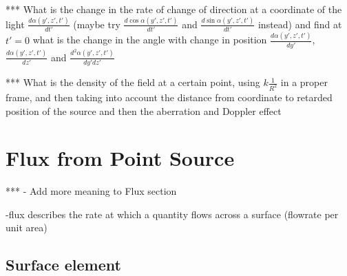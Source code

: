 *** What is the change in the rate of change of direction at a coordinate of the light $\frac{d\alpha(y{'},z{'},t{'})}{dt{'}}$ (maybe try $\frac{d\cos\alpha(y{'},z{'},t{'})}{dt{'}}$ and $\frac{d\sin\alpha(y{'},z{'},t{'})}{dt{'}}$ instead) and find at ${t{'}} = 0$ what is the change in the angle with change in position $\frac{d\alpha(y{'},z{'},t{'})}{dy{'}}$, $\frac{d\alpha(y{'},z{'},t{'})}{dz{'}}$ and $\frac{d^2\alpha(y{'},z{'},t{'})}{{dy{'}}{dz{'}}}$

*** What is the density of the field at a certain point, using $k \frac{1}{R^2}$ in a proper frame, and then taking into account the distance from coordinate to retarded position of the source and then the aberration and Doppler effect

\section{Flux from Point Source} \label{sect: Flux from Point Source}

*** - Add more meaning to Flux section

-flux describes the rate at which a quantity flows across a surface (flowrate per unit area)

\subsection{Surface element} \label{subsect: Surface element}

